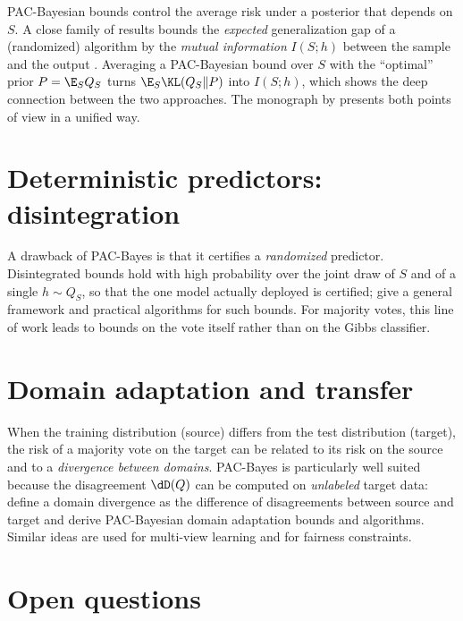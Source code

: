 PAC-Bayesian bounds control the average risk under a posterior that depends on
$S$. A close family of results bounds the \emph{expected} generalization gap of
a (randomized) algorithm by the \emph{mutual information} $I(S;h)$ between the
sample and the output \citep{xu2017information}. Averaging a PAC-Bayesian bound
over $S$ with the ``optimal'' prior $P=\E_SQ_S$ turns $\E_S\KL(Q_S\|P)$ into
$I(S;h)$, which shows the deep connection between the two approaches. The
monograph by \citet{hellstrom2025generalization} presents both points of view in a
unified way.

\section{Deterministic predictors: disintegration}

A drawback of PAC-Bayes is that it certifies a \emph{randomized} predictor.
Disintegrated bounds \citep{blanchard2007occam,rivasplata2020pac} hold with
high probability over the joint draw of $S$ and of a single $h\sim Q_S$, so
that the one model actually deployed is certified;
\citet{viallard2024general} give a general framework and practical algorithms
for such bounds. For majority votes, this line of work leads to bounds on the
vote itself rather than on the Gibbs classifier.

\section{Domain adaptation and transfer}

When the training distribution (source) differs from the test distribution
(target), the risk of a majority vote on the target can be related to its risk
on the source and to a \emph{divergence between domains}. PAC-Bayes is
particularly well suited because the disagreement $\dD(Q)$ can be computed on
\emph{unlabeled} target data: \citet{germain2013pac,germain2020pac} define a
domain divergence as the difference of disagreements between source and target
and derive PAC-Bayesian domain adaptation bounds and algorithms. Similar ideas
are used for multi-view learning and for fairness constraints.

\section{Open questions}

